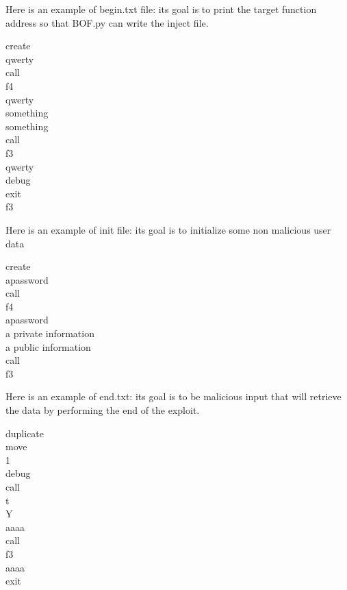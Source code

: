 \documentclass[a4paper, 11pt]{article}
\begin{document}
Here is an example of begin.txt file: its goal is to print the target function address so that BOF.py can write the inject file.
\begin{center}
\begin{tcolorbox}[colback=white!5!white, colframe=gray!75!black, title=begin.txt]
create\\
qwerty\\
call\\
f4\\
qwerty\\
something\\
something\\
call\\
f3\\
qwerty\\
debug\\
exit\\
f3
\end{tcolorbox}

Here is an example of init file: its goal is to initialize some non malicious user data
\begin{tcolorbox}[colback=white!5!white, colframe=gray!75!black, title=init]
create\\
apassword\\
call\\
f4\\
apassword\\
a private information\\
a public information\\
call\\
f3
\end{tcolorbox}
Here is an example of end.txt: its goal is to be malicious input that will retrieve the data by performing the end of the exploit.
\begin{tcolorbox}[colback=white!5!white, colframe=gray!75!black, title=end.txt]
duplicate\\
move\\
1\\
debug\\
call\\
t\\
Y\\
aaaa\\
call\\
f3\\
aaaa\\
exit\\
\end{tcolorbox}
\end{center}
\end{document}

